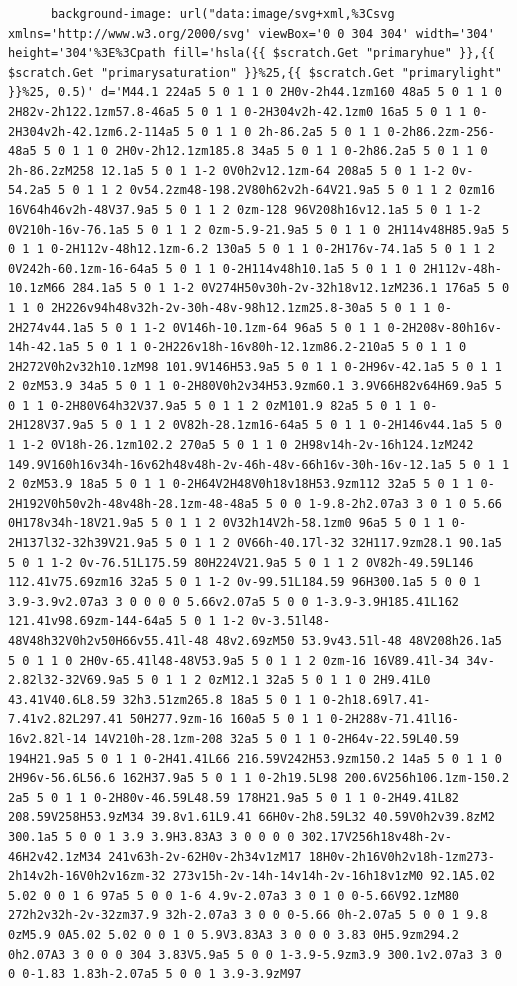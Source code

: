\documentclass[11pt]{article}
\begin{document}
\begin{enumerate}
\begin{verbatim}
      background-image: url("data:image/svg+xml,%3Csvg xmlns='http://www.w3.org/2000/svg' viewBox='0 0 304 304' width='304' height='304'%3E%3Cpath fill='hsla({{ $scratch.Get "primaryhue" }},{{ $scratch.Get "primarysaturation" }}%25,{{ $scratch.Get "primarylight" }}%25, 0.5)' d='M44.1 224a5 5 0 1 1 0 2H0v-2h44.1zm160 48a5 5 0 1 1 0 2H82v-2h122.1zm57.8-46a5 5 0 1 1 0-2H304v2h-42.1zm0 16a5 5 0 1 1 0-2H304v2h-42.1zm6.2-114a5 5 0 1 1 0 2h-86.2a5 5 0 1 1 0-2h86.2zm-256-48a5 5 0 1 1 0 2H0v-2h12.1zm185.8 34a5 5 0 1 1 0-2h86.2a5 5 0 1 1 0 2h-86.2zM258 12.1a5 5 0 1 1-2 0V0h2v12.1zm-64 208a5 5 0 1 1-2 0v-54.2a5 5 0 1 1 2 0v54.2zm48-198.2V80h62v2h-64V21.9a5 5 0 1 1 2 0zm16 16V64h46v2h-48V37.9a5 5 0 1 1 2 0zm-128 96V208h16v12.1a5 5 0 1 1-2 0V210h-16v-76.1a5 5 0 1 1 2 0zm-5.9-21.9a5 5 0 1 1 0 2H114v48H85.9a5 5 0 1 1 0-2H112v-48h12.1zm-6.2 130a5 5 0 1 1 0-2H176v-74.1a5 5 0 1 1 2 0V242h-60.1zm-16-64a5 5 0 1 1 0-2H114v48h10.1a5 5 0 1 1 0 2H112v-48h-10.1zM66 284.1a5 5 0 1 1-2 0V274H50v30h-2v-32h18v12.1zM236.1 176a5 5 0 1 1 0 2H226v94h48v32h-2v-30h-48v-98h12.1zm25.8-30a5 5 0 1 1 0-2H274v44.1a5 5 0 1 1-2 0V146h-10.1zm-64 96a5 5 0 1 1 0-2H208v-80h16v-14h-42.1a5 5 0 1 1 0-2H226v18h-16v80h-12.1zm86.2-210a5 5 0 1 1 0 2H272V0h2v32h10.1zM98 101.9V146H53.9a5 5 0 1 1 0-2H96v-42.1a5 5 0 1 1 2 0zM53.9 34a5 5 0 1 1 0-2H80V0h2v34H53.9zm60.1 3.9V66H82v64H69.9a5 5 0 1 1 0-2H80V64h32V37.9a5 5 0 1 1 2 0zM101.9 82a5 5 0 1 1 0-2H128V37.9a5 5 0 1 1 2 0V82h-28.1zm16-64a5 5 0 1 1 0-2H146v44.1a5 5 0 1 1-2 0V18h-26.1zm102.2 270a5 5 0 1 1 0 2H98v14h-2v-16h124.1zM242 149.9V160h16v34h-16v62h48v48h-2v-46h-48v-66h16v-30h-16v-12.1a5 5 0 1 1 2 0zM53.9 18a5 5 0 1 1 0-2H64V2H48V0h18v18H53.9zm112 32a5 5 0 1 1 0-2H192V0h50v2h-48v48h-28.1zm-48-48a5 5 0 0 1-9.8-2h2.07a3 3 0 1 0 5.66 0H178v34h-18V21.9a5 5 0 1 1 2 0V32h14V2h-58.1zm0 96a5 5 0 1 1 0-2H137l32-32h39V21.9a5 5 0 1 1 2 0V66h-40.17l-32 32H117.9zm28.1 90.1a5 5 0 1 1-2 0v-76.51L175.59 80H224V21.9a5 5 0 1 1 2 0V82h-49.59L146 112.41v75.69zm16 32a5 5 0 1 1-2 0v-99.51L184.59 96H300.1a5 5 0 0 1 3.9-3.9v2.07a3 3 0 0 0 0 5.66v2.07a5 5 0 0 1-3.9-3.9H185.41L162 121.41v98.69zm-144-64a5 5 0 1 1-2 0v-3.51l48-48V48h32V0h2v50H66v55.41l-48 48v2.69zM50 53.9v43.51l-48 48V208h26.1a5 5 0 1 1 0 2H0v-65.41l48-48V53.9a5 5 0 1 1 2 0zm-16 16V89.41l-34 34v-2.82l32-32V69.9a5 5 0 1 1 2 0zM12.1 32a5 5 0 1 1 0 2H9.41L0 43.41V40.6L8.59 32h3.51zm265.8 18a5 5 0 1 1 0-2h18.69l7.41-7.41v2.82L297.41 50H277.9zm-16 160a5 5 0 1 1 0-2H288v-71.41l16-16v2.82l-14 14V210h-28.1zm-208 32a5 5 0 1 1 0-2H64v-22.59L40.59 194H21.9a5 5 0 1 1 0-2H41.41L66 216.59V242H53.9zm150.2 14a5 5 0 1 1 0 2H96v-56.6L56.6 162H37.9a5 5 0 1 1 0-2h19.5L98 200.6V256h106.1zm-150.2 2a5 5 0 1 1 0-2H80v-46.59L48.59 178H21.9a5 5 0 1 1 0-2H49.41L82 208.59V258H53.9zM34 39.8v1.61L9.41 66H0v-2h8.59L32 40.59V0h2v39.8zM2 300.1a5 5 0 0 1 3.9 3.9H3.83A3 3 0 0 0 0 302.17V256h18v48h-2v-46H2v42.1zM34 241v63h-2v-62H0v-2h34v1zM17 18H0v-2h16V0h2v18h-1zm273-2h14v2h-16V0h2v16zm-32 273v15h-2v-14h-14v14h-2v-16h18v1zM0 92.1A5.02 5.02 0 0 1 6 97a5 5 0 0 1-6 4.9v-2.07a3 3 0 1 0 0-5.66V92.1zM80 272h2v32h-2v-32zm37.9 32h-2.07a3 3 0 0 0-5.66 0h-2.07a5 5 0 0 1 9.8 0zM5.9 0A5.02 5.02 0 0 1 0 5.9V3.83A3 3 0 0 0 3.83 0H5.9zm294.2 0h2.07A3 3 0 0 0 304 3.83V5.9a5 5 0 0 1-3.9-5.9zm3.9 300.1v2.07a3 3 0 0 0-1.83 1.83h-2.07a5 5 0 0 1 3.9-3.9zM97 
\end{verbatim}
\end{enumerate}
\end{document}
